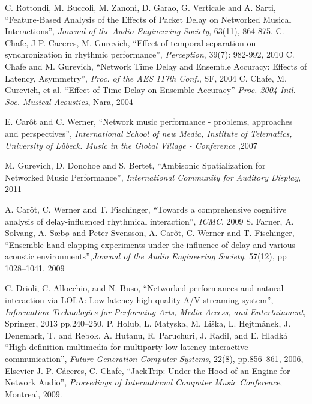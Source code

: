 \documentclass[conference]{IEEEtran}
\begin{document}
\begin{thebibliography}{6}
C. Rottondi, M. Buccoli, M. Zanoni, D. Garao,  G. Verticale and A. Sarti, ``Feature-Based Analysis of the Effects of Packet Delay on Networked Musical Interactions'', \emph{Journal of the Audio Engineering Society}, 63(11), 864-875.
C. Chafe, J-P. Caceres, M. Gurevich, ``Effect of temporal separation on synchronization in rhythmic performance'',
\emph{Perception}, 39(7): 982-992, 2010
%
C. Chafe and M. Gurevich, ``Network Time Delay and Ensemble Accuracy: Effects of Latency, Asymmetry'', \emph{Proc. of the AES 117th Conf.}, SF, 2004
%
C. Chafe, M. Gurevich, et al. ``Effect of Time Delay on Ensemble Accuracy''
\emph{Proc. 2004 Intl. Soc. Musical Acoustics}, Nara, 2004

E. Car\^ot and C. Werner, ``Network music performance - problems, approaches and perspectives'',
\emph{International School of new Media, Institute of Telematics, University of Lübeck. Music in the Global Village - Conference} ,2007
%

M. Gurevich, D. Donohoe and S. Bertet, ``Ambisonic Spatialization for Networked Music Performance'', \emph{International Community for Auditory Display}, 2011

A. Car{\^o}t, C. Werner and T. Fischinger, ``Towards a comprehensive cognitive analysis of delay-influenced rhythmical interaction'', \emph{ICMC}, 2009
%
S. Farner, A. Solvang, A. S{\ae}b{\o} and Peter Svensson, A. Car{\^o}t, C. Werner and T. Fischinger, ``Ensemble hand-clapping experiments under the influence of delay and various acoustic
environments'',\emph{Journal of the Audio Engineering Society}, 57(12), pp 1028--1041, 2009

C. Drioli, C. Allocchio, and N. Buso,
``Networked performances and natural interaction via LOLA: Low latency high quality A/V streaming system'',
\emph{Information Technologies for Performing Arts, Media Access, and Entertainment}, Springer, 2013
pp.240--250,
P. Holub, L. Matyska, M. Li{\v{s}}ka, L. Hejtm{\'a}nek, J. Denemark, T. and Rebok, A. Hutanu, R. Paruchuri, J. Radil, and E. Hladk{\'a}
``High-definition multimedia for multiparty low-latency interactive communication'',
\emph{Future Generation Computer Systems},
22(8),
pp.856--861,
2006,
Elsevier
J.-P. C\'{a}ceres, C. Chafe, ``JackTrip: Under the Hood of an Engine for Network Audio'', \emph{Proceedings of International Computer Music Conference}, Montreal, 2009. 


\end{thebibliography}
\end{document}
